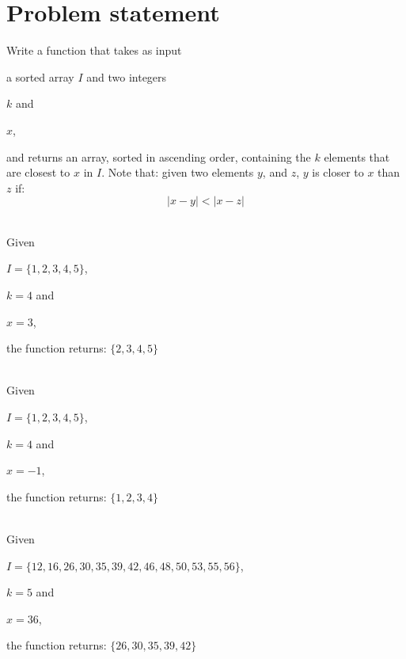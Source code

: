 \section{Problem statement}
\begin{exercise}

	Write a function that takes as input
	\begin{itemize*}
		\item a sorted array $I$ and two integers
		\item $k$ and
		\item $x$,
	\end{itemize*}
	and returns an array, sorted in ascending order, containing the $k$ elements that are closest to
	$x$ in $I$. Note that: given two elements $y$, and $z$, $y$ is closer to $x$ than $z$ if:
	\begin{equation}
		|x-y| < |x-z|
	\label{eq:kclosest_in_array:sort_criteria}
	\end{equation}
	 

	\begin{example}
		\hfill \\
		Given
		\begin{itemize*}
			\item $I = \{1,2,3,4,5\}$,
			\item $k=4$ and
			\item $x=3$,
		\end{itemize*} 
		the function returns: $\{2,3,4,5\}$
	\end{example}

	\begin{example}
		\hfill \\
		Given
		\begin{itemize*}
			\item $I = \{1,2,3,4,5\}$,
			\item $k=4$ and
			\item $x=-1$,
		\end{itemize*} 
		the function returns: $\{1,2,3,4\}$
	\end{example}

	\begin{example}
		\hfill \\
		Given
		\begin{itemize*}
			\item $I = \{12,16,26,30,35,39,42,46,48,50,53,55,56\}$,
			\item $k=5$ and
			\item $x=36$,
		\end{itemize*} 
		 the function returns: $\{26,30,35,39,42\}$
	\end{example}
\end{exercise}

